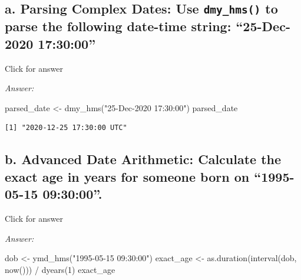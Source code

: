 \documentclass[
]{book}
\newenvironment{Shaded}{\begin{snugshade}}{\end{snugshade}}
\newcommand{\DecValTok}[1]{\textcolor[rgb]{0.00,0.00,0.81}{#1}}
\newcommand{\FunctionTok}[1]{\textcolor[rgb]{0.00,0.00,0.00}{#1}}
\newcommand{\NormalTok}[1]{#1}
\newcommand{\OtherTok}[1]{\textcolor[rgb]{0.56,0.35,0.01}{#1}}
\newcommand{\SpecialCharTok}[1]{\textcolor[rgb]{0.00,0.00,0.00}{#1}}
\newcommand{\StringTok}[1]{\textcolor[rgb]{0.31,0.60,0.02}{#1}}
\begin{document}
\hypertarget{a.-parsing-complex-dates-use-dmy_hms-to-parse-the-following-date-time-string-25-dec-2020-173000}{%
\subsection{\texorpdfstring{a. Parsing Complex Dates: Use \texttt{dmy\_hms()} to parse the following date-time string: ``25-Dec-2020 17:30:00''}{a. Parsing Complex Dates: Use dmy\_hms() to parse the following date-time string: ``25-Dec-2020 17:30:00''}}\label{a.-parsing-complex-dates-use-dmy_hms-to-parse-the-following-date-time-string-25-dec-2020-173000}}

Click for answer

\emph{Answer:}

\begin{Shaded}
\begin{Highlighting}[]
\NormalTok{parsed\_date }\OtherTok{\textless{}{-}} \FunctionTok{dmy\_hms}\NormalTok{(}\StringTok{"25{-}Dec{-}2020 17:30:00"}\NormalTok{)}
\NormalTok{parsed\_date}
\end{Highlighting}
\end{Shaded}

\begin{verbatim}
[1] "2020-12-25 17:30:00 UTC"
\end{verbatim}

\hypertarget{b.-advanced-date-arithmetic-calculate-the-exact-age-in-years-for-someone-born-on-1995-05-15-093000.}{%
\subsection{b. Advanced Date Arithmetic: Calculate the exact age in years for someone born on ``1995-05-15 09:30:00''.}\label{b.-advanced-date-arithmetic-calculate-the-exact-age-in-years-for-someone-born-on-1995-05-15-093000.}}

Click for answer

\emph{Answer:}

\begin{Shaded}
\begin{Highlighting}[]
\NormalTok{dob }\OtherTok{\textless{}{-}} \FunctionTok{ymd\_hms}\NormalTok{(}\StringTok{"1995{-}05{-}15 09:30:00"}\NormalTok{)}
\NormalTok{exact\_age }\OtherTok{\textless{}{-}} \FunctionTok{as.duration}\NormalTok{(}\FunctionTok{interval}\NormalTok{(dob, }\FunctionTok{now}\NormalTok{())) }\SpecialCharTok{/} \FunctionTok{dyears}\NormalTok{(}\DecValTok{1}\NormalTok{)}
\NormalTok{exact\_age}
\end{Highlighting}
\end{Shaded}
\end{document}
